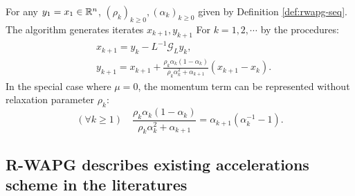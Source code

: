 \documentclass[12pt]{article}
\begin{document}
    \begin{definition}\label{def:r-wapg-momentum-form}
        For any $y_1 = x_1 \in \mathbb R^n$, $(\rho_k)_{k \ge 0}, (\alpha_k)_{k\ge 0}$ given by Definition \ref{def:rwapg-seq}. 
        The algorithm generates iterates $x_{k + 1}, y_{k + 1}$ For $k = 1, 2, \cdots $ by the procedures: 
        \begin{align*}
            & x_{k + 1} = y_k - L^{-1}\mathcal G_Ly_k, 
            \\
            & 
            y_{k + 1} = 
            x_{k + 1} + 
            \frac{\rho_k\alpha_k(1 - \alpha_k)}{\rho_k\alpha_k^2 + \alpha_{k + 1}}(x_{k + 1} - x_k). 
        \end{align*}
        In the special case where $\mu = 0$, the momentum term can be represented without relaxation parameter $\rho_k$: 
        $$
            (\forall k \ge 1)\quad \frac{\rho_k\alpha_k(1 - \alpha_k)}{\rho_k\alpha_k^2 + \alpha_{k + 1}} 
            = \alpha_{k + 1}(\alpha_k^{-1} - 1).  
        $$
    \end{definition}
    \begin{remark}
    \end{remark}

\subsection{R-WAPG describes existing accelerations scheme in the literatures}

    \begin{lemma}
        
    \end{lemma}
\end{document}
